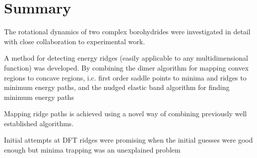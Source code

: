 \chapter{Summary}
\label{chap:summary}

The rotational dynamics of two complex borohydrides were investigated in detail with close collaboration to experimental work.

A method for detecting energy ridges (easily applicable to any multidimensional function) was developed.
By combining the dimer algorithm for mapping convex regions to concave regions, i.c. first order saddle points to minima and ridges to minimum energy paths, and the nudged elastic band algorithm for finding minimum energy paths


\bit
\item Mapping ridge paths is achieved using a novel way of combining previously well established  algorithms.
\item \expand
\item Initial attempts at DFT ridges were promising when the initial guesses were good enough but minima trapping was an unexplained problem
\eit

\placeholder







